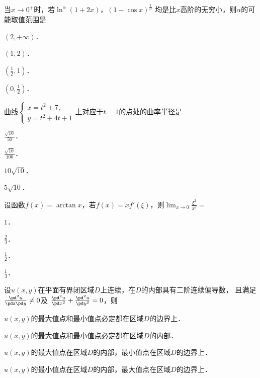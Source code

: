 \documentclass[plain,noanswer,medmath]{../../template/jnuexam}
\begin{document}






\begin{problem}
当$x \to 0^+$时，若$\ln^{\alpha}(1 + 2x)$，$(1 - \cos x)^{\frac{1}{\alpha}}$
均是比$x$高阶的无穷小，则$\alpha$的可能取值范围是\pickout{}
\begin{abcd}
\item $(2, +\infty)$．
\item $(1,2)$．
\item $\left(\frac{1}{2},1 \right)$．
\item $\left(0,\frac{1}{2} \right)$．
\end{abcd}
\end{problem}






\begin{problem}
曲线$\begin{cases}
  x = t^2 + 7, \\
  y = t^2 + 4t + 1
\end{cases}$上对应于$t = 1$的点处的曲率半径是\pickout{}
\begin{abcd}
\item $\frac{\sqrt{10}}{50}$．
\item $\frac{\sqrt{10}}{100}$．
\item $10\sqrt{10}$．
\item $5\sqrt{10}$．
\end{abcd}
\end{problem}


\begin{problem}
设函数$f(x) = \arctan x$，若$f(x) = xf'(\xi)$，则$\lim_{x \to 0} \frac{\xi^2}{x^2} =$\pickout{}
\begin{abcd}
\item $1$．
\item $\frac{2}{3}$．
\item $\frac{1}{2}$．
\item $\frac{1}{3}$．
\end{abcd}
\end{problem}


\begin{problem}
设$u(x,y)$在平面有界闭区域$D$上连续，在$D$的内部具有二阶连续偏导数，
且满足$\frac{\pd^2 u}{\pdx\pd y} \ne 0$及
$\frac{\pd^2 u}{\pd x^2} + \frac{\pd^2 u}{\pd y^2} = 0$，则\pickout{}
\begin{abcd}
\item $u(x,y)$的最大值点和最小值点必定都在区域$D$的边界上．
\item $u(x,y)$的最大值点和最小值点必定都在区域$D$的内部．
\item $u(x,y)$的最大值点在区域$D$的内部，最小值点在区域$D$的边界上．
\item $u(x,y)$的最小值点在区域$D$的内部，最大值点在区域$D$的边界上．
\end{abcd}
\end{problem}
\end{document}
